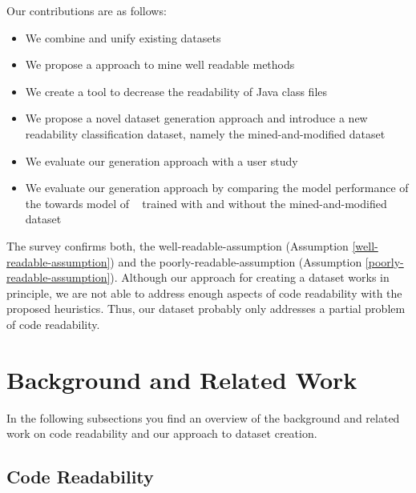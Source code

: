 \documentclass[%
class=scrreprt,
chapterprefix=false,%
open=right,%
twoside=false,%
paper=a4,%
logofile={Logo\_zentral\_farbig\_EN.png},%
thesistype=master,%
UKenglish,%
]{se2thesis}
\theoremstyle{definition}
\newcommand{\citeolddataset}{\cite{buse2009learning, dorn2012general, scalabrino2018comprehensive}}
\begin{document}
	Our contributions are as follows:
	\begin{itemize}
		\item We combine and unify existing datasets~\citeolddataset
		\item We propose a approach to mine well readable methods
		\item We create a tool to decrease the readability of Java class files
		\item We propose a novel dataset generation approach and introduce a new readability classification dataset, namely the mined-and-modified dataset
		\item We evaluate our generation approach with a user study
		\item We evaluate our generation approach by comparing the model performance of the towards model of \citeauthor{mi2022towards}~\cite{mi2022towards} trained with and without the mined-and-modified dataset	
	\end{itemize}
	
	The survey confirms both, the well-readable-assumption (Assumption \ref{well-readable-assumption}) and the poorly-readable-assumption (Assumption \ref{poorly-readable-assumption}). Although our approach for creating a dataset works in principle, we are not able to address enough aspects of code readability with the proposed heuristics. Thus, our dataset probably only addresses a partial problem of code readability.
		
\section{Background and Related Work} \label{Background and Related Work}
	In the following subsections you find an overview of the background and related work on code readability and our approach to dataset creation.
	
\subsection{Code Readability} \label{Code Readability}
		
\end{document}
